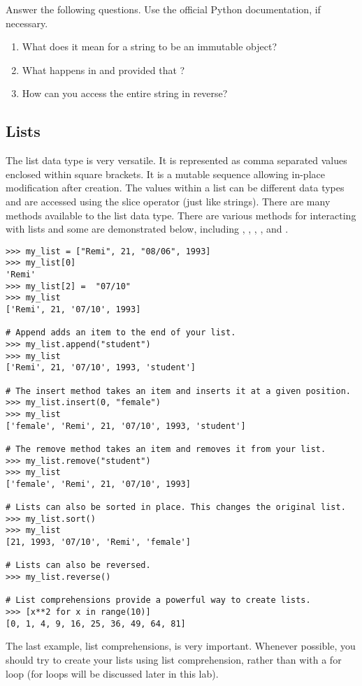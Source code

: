 \begin{problem}
Answer the following questions. Use the official Python documentation, if necessary.
\begin{enumerate}
\item What does it mean for a string to be an immutable object? 
\item What happens in  and  provided 
that ? 
\item How can you access the entire string in reverse?
\end{enumerate}
\end{problem}

\subsection*{Lists}
\begin{example}
The list data type is very versatile. 
It is represented as comma separated values enclosed within square brackets. 
It is a mutable sequence allowing in-place modification after creation. 
The values within a list can be different data types and are accessed using the 
slice operator (just like strings). There are many methods available to the list data type. 
There are various methods for interacting with lists and some are demonstrated below, including , , , , and .

\begin{lstlisting}
>>> my_list = ["Remi", 21, "08/06", 1993]
>>> my_list[0]
'Remi'
>>> my_list[2] =  "07/10"
>>> my_list
['Remi', 21, '07/10', 1993]

# Append adds an item to the end of your list.
>>> my_list.append("student")
>>> my_list
['Remi', 21, '07/10', 1993, 'student']

# The insert method takes an item and inserts it at a given position. 
>>> my_list.insert(0, "female")
>>> my_list
['female', 'Remi', 21, '07/10', 1993, 'student']

# The remove method takes an item and removes it from your list.
>>> my_list.remove("student")
>>> my_list
['female', 'Remi', 21, '07/10', 1993]

# Lists can also be sorted in place. This changes the original list.
>>> my_list.sort()
>>> my_list
[21, 1993, '07/10', 'Remi', 'female']

# Lists can also be reversed.
>>> my_list.reverse()

# List comprehensions provide a powerful way to create lists. 
>>> [x**2 for x in range(10)]
[0, 1, 4, 9, 16, 25, 36, 49, 64, 81]

\end{lstlisting}
The last example, list comprehensions, is very important. Whenever possible, you should try to create your lists using list comprehension, rather than with a for loop (for loops will be discussed later in this lab).
\label{exp:lists}
\end{example}

